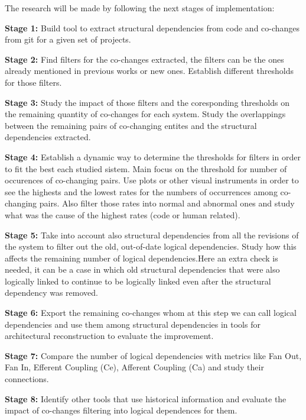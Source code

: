 \documentclass[12pt,a4paper,oneside]{report}
\begin{document}
The research will be made by following the next stages of implementation:

\textbf{Stage 1:} Build tool to extract structural dependencies from code and co-changes from git for a given set of projects.

\textbf{Stage 2:} Find filters for the co-changes extracted, the filters can be the ones already mentioned in previous works or new ones. Establish different thresholds for those filters.

\textbf{Stage 3:} Study the impact of those filters and the coresponding thresholds on the remaining quantity of co-changes for each system.
Study the overlappings between the remaining pairs of co-changing entites and the structural dependencies extracted.

\textbf{Stage 4:} Establish a dynamic way to determine the thresholds for filters in order to fit the best each studied sistem. Main focus on the threshold for number of occurences of co-changing pairs.
Use plots or other visual instruments in order to see the highests and the lowest rates for the numbers of occurrences among co-changing pairs.
Also filter those rates into normal and abnormal ones and study what was the cause of the highest rates (code or human related).

\textbf{Stage 5:} Take into account also structural dependencies from all the revisions of the system to filter out the old, out-of-date logical dependencies. 
Study how this affects the remaining number of logical dependencies.Here an extra check is needed, it can be a case in which old structural dependencies that were also logically linked to continue to be logically linked
even after the structural dependency was removed.

\textbf{Stage 6:} Export the remaining co-changes whom at this step we can call logical dependencies and use them among structural dependencies in tools for architectural reconstruction to evaluate the improvement.

\textbf{Stage 7:} Compare the number of logical dependencies with metrics like Fan Out, Fan In, Efferent Coupling (Ce), Afferent Coupling (Ca) and study their connections.

\textbf{Stage 8:} Identify other tools that use historical information and evaluate the impact of co-changes filtering into logical dependences for them. 
\end{document}

